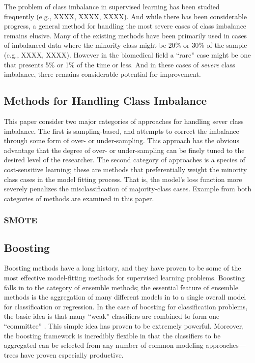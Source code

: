 \documentclass[10pt]{article}
\begin{document}
The problem of class imbalance in supervised learning has been studied frequently (e.g., XXXX, XXXX, XXXX). And while there has been considerable progress, a general method for handling the most severe cases of class imbalance remains elusive. Many of the existing methods have been primarily used in cases of imbalanced data where the minority class might be 20\% or 30\% of the sample (e.g., XXXX, XXXX). However in the biomedical field a ``rare'' case might be one that presents 5\% or 1\% of the time or less. And in these cases of \textit{severe} class imbalance, there remains considerable potential for improvement. 


\subsection{Methods for Handling Class Imbalance}
This paper consider two major categories of approaches for handling sever class imbalance. The first is sampling-based, and attempts to correct the imbalance through some form of over- or under-sampling. This approach has the obvious advantage that the degree of over- or under-sampling can be finely tuned to the desired level of the researcher. The second category of approaches is a species of cost-sensitive learning; these are methods that preferentially weight the minority class cases in the model fitting process. That is, the model's loss function more severely penalizes the misclassification of majority-class cases. Example from both categories of methods are examined in this paper.

\subsubsection{SMOTE}



\subsection{Boosting}
Boosting methods have a long history, and they have proven to be some of the most effective model-fitting methods for supervised learning problems. Boosting falls in to the category of ensemble methods; the essential feature of ensemble methods is the aggregation of many different models in to a single overall model for classification or regression. In the case of boosting for classification problems, the basic idea is that many ``weak'' classifiers are combined to form one ``committee'' \cite{hastie09}. This simple idea has proven to be extremely powerful. Moreover, the boosting framework is incredibly flexible in that the classifiers to be aggregated can be selected from any number of common modeling approaches---trees have proven especially productive.
\end{document}

